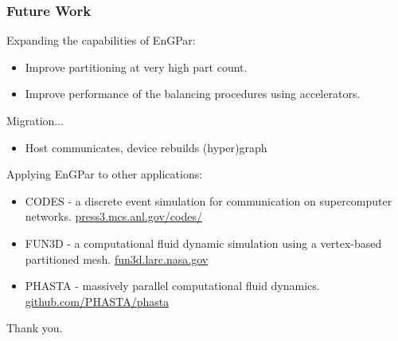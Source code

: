 \documentclass{beamer}
\begin{document}
\begin{frame}
  \frametitle{Future Work}
  Expanding the capabilities of EnGPar:
  \begin{itemize}
    \item Improve partitioning at very high part count.
    \item Improve performance of the balancing procedures using accelerators.
  \end{itemize}
  Migration...
  \begin{itemize}
    \item Host communicates, device rebuilds (hyper)graph
  \end{itemize}
  Applying EnGPar to other applications:
  \begin{itemize}
    \item CODES - a discrete event simulation for communication on supercomputer networks. \url{press3.mcs.anl.gov/codes/}
    \item FUN3D - a computational fluid dynamic simulation using a vertex-based partitioned mesh. \url{fun3d.larc.nasa.gov}
    \item PHASTA - massively parallel computational fluid dynamics. \url{github.com/PHASTA/phasta}
  \end{itemize}
\end{frame}

\begin{frame}
  \centering
  \Huge{Thank you.}
\end{frame}
\end{document}
